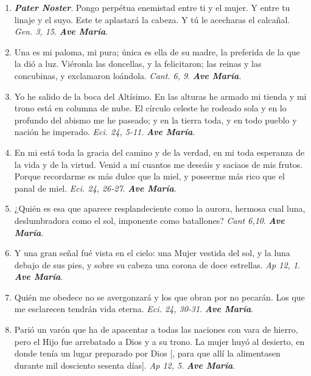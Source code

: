 \documentclass[../../devocionario.tex]{subfiles}
\begin{document}
    \begin{enumerate}

        \item \textbf{\textit{Pater Noster}}. Pongo perpétua enemistad entre ti y el mujer. Y entre tu linaje y el suyo. Este te aplastará la cabeza.
            Y tú le acecharas el calcañal. \textit{Gen. 3, 15}. \textbf{\textit{Ave María}}.
    
        \item Una es mi paloma, mi pura; única es ella de su madre, la preferida de la que la dió a luz. Viéronla las doncellas, 
            y la felicitaron; las reinas y las concubinas, y exclamaron loándola. \textit{Cant. 6, 9}. \textbf{\textit{Ave María}}.

        \item Yo he salido de la boca del Altísimo. En las alturas he armado mi tienda y mi trono está en columna de nube. El círculo celeste he rodeado sola y en lo profundo 
            del abismo me he paseado; y en la tierra toda, y en todo pueblo y nación he imperado. \textit{Eci. 24, 5-11}. \textbf{\textit{Ave María}}.

        \item En mi está toda la gracia del camino y de la verdad, en mi toda esperanza de la vida y de la virtud. Venid a mí cuantos me deseáis y saciaos de mis frutos. Porque recordarme 
            es más dulce que la miel, y poseerme más rico que el panal de miel. \textit{Eci. 24, 26-27}. \textbf{\textit{Ave María}}.

        \item ¿Quién es esa que aparece resplandeciente como la aurora, hermosa cual luna, deslumbradora como el sol, imponente como batallones? 
            \textit{Cant 6,10}. \textbf{\textit{Ave María}}.

        \item Y una gran señal fué vista en el cielo: una Mujer vestida del sol, y la luna debajo de sus pies, y sobre su cabeza una corona de doce estrellas. 
            \textit{Ap 12, 1}. \textbf{\textit{Ave María}}.

        \item Quién me obedece no se avergonzará y los que obran por no pecarán. Los que me esclarecen tendrán vida eterna. 
            \textit{Eci. 24, 30-31}. \textbf{\textit{Ave María}}.

        \item Parió un varón que ha de apacentar a todas las naciones con vara de hierro, pero el Hijo fue arrebatado a Dios y a su trono. La mujer huyó
            al desierto, en donde tenía un lugar preparado por Dios [, para que allí la alimentasen durante mil dosciento sesenta días]. \textit{Ap 12, 5}. \textbf{\textit{Ave María}}.


\end{enumerate}
\end{document}
